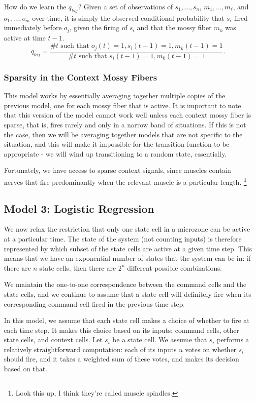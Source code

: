 \documentclass{article}
\theoremstyle{definition}
\begin{document}
How do we learn the $q_{kij}$? Given a set of observations of $s_1,
\dots, s_n$, $m_1, \dots, m_\ell$, and $o_1, \dots, o_m$ over time, it
is simply the observed conditional probability that $s_i$ fired
immediately before $o_j$, given the firing of $s_i$ and that the mossy
fiber $m_k$ was active at time $t-1$.
$$q_{kij} = \frac{\mbox{\# $t$ such that $o_j(t)=1, s_i(t-1)=1, m_k(t-1)=1$}}
{\mbox{\# $t$ such that $s_i(t-1)=1, m_k(t-1)=1$}}.$$

\subsubsection{Sparsity in the Context Mossy Fibers}

This model works by essentially averaging together multiple copies of
the previous model, one for each mossy fiber that is active. It is
important to note that this version of the model cannot work well
unless each context mossy fiber is sparse, that is, fires rarely and
only in a narrow band of situations. If this is not the case, then we
will be averaging together models that are not specific to the
situation, and this will make it impossible for the transition
function to be appropriate - we will wind up transitioning to a random
state, essentially.

Fortunately, we have access to sparse context signals, since muscles
contain nerves that fire predominantly when the relevant muscle is a
particular length. 
\footnote{Look this up, I think they're called muscle spindles.}

\subsection{Model 3: Logistic Regression}

We now relax the restriction that only one state cell in a microzone
can be active at a particular time. The state of the system (not
counting inputs) is therefore represented by which subset of the state
cells are active at a given time step. This means that we have an
exponential number of states that the system can be in: if there are
$n$ state cells, then there are $2^n$ different possible combinations.

We maintain the one-to-one correspondence between the command cells
and the state cells, and we continue to assume that a state cell will
definitely fire when its corresponding command cell fired in the
previous time step.

In this model, we assume that each state cell makes a choice of
whether to fire at each time step. It makes this choice based on its
inputs: command cells, other state cells, and context cells. Let $s_i$
be a state cell. We assume that $s_i$ performs a relatively
straightforward computation: each of its inputs $u$ votes on whether
$s_i$ should fire, and it takes a weighted sum of these votes, and
makes its decision based on that. 
\end{document}
